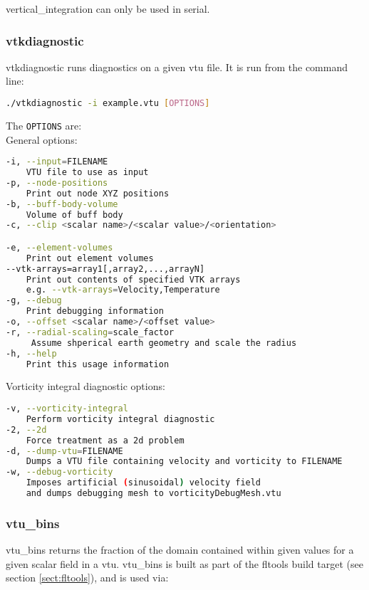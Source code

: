 vertical\_integration can only be used in serial.


\subsubsection{vtkdiagnostic}
\label{sect:vtkdiagnostic}
vtkdiagnostic runs diagnostics on a given vtu file. It is run from the command line:
\begin{lstlisting}[language = Bash]
./vtkdiagnostic -i example.vtu [OPTIONS]
\end{lstlisting}

The \lstinline[language = Bash]+OPTIONS+ are: \\
General options:
\begin{lstlisting}[language = Bash]
-i, --input=FILENAME
	VTU file to use as input
-p, --node-positions
	Print out node XYZ positions
-b, --buff-body-volume
	Volume of buff body
-c, --clip <scalar name>/<scalar value>/<orientation>

-e, --element-volumes
	Print out element volumes
--vtk-arrays=array1[,array2,...,arrayN]
	Print out contents of specified VTK arrays
	e.g. --vtk-arrays=Velocity,Temperature
-g, --debug
	Print debugging information
-o, --offset <scalar name>/<offset value>
-r, --radial-scaling=scale_factor
	 Assume shperical earth geometry and scale the radius
-h, --help
	Print this usage information
\end{lstlisting}
Vorticity integral diagnostic options:
\begin{lstlisting}[language = Bash]
-v, --vorticity-integral
	Perform vorticity integral diagnostic
-2, --2d
	Force treatment as a 2d problem
-d, --dump-vtu=FILENAME
	Dumps a VTU file containing velocity and vorticity to FILENAME
-w, --debug-vorticity
	Imposes artificial (sinusoidal) velocity field
	and dumps debugging mesh to vorticityDebugMesh.vtu
\end{lstlisting}


\subsubsection{vtu\_bins}
\label{sect:vtu_bins}

vtu\_bins returns the fraction of the domain contained within given values
for a given scalar field in a vtu. vtu\_bins is built as part of the fltools
build target (see section \ref{sect:fltools}), and is used via:


